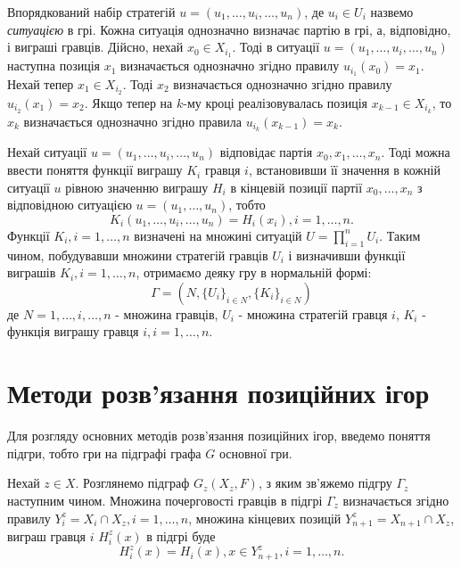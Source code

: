 \documentclass[12pt,a4paper]{article}
\begin{document}
Впорядкований набір стратегій $u=(u_1,\dots,u_i,\dots,u_n)$, де $u_i \in
U_i$ назвемо \textit{ситуацією} в грі. Кожна ситуація однозначно визначає
партію в грі, а, відповідно, і виграші гравців. Дійсно, нехай $x_0 \in
X_{i_1}$. Тоді в ситуації $u=(u_1,\dots,u_i,\dots,u_n)$ наступна позиція $x_1$
визначається однозначно згідно правилу $u_{i_1}(x_0)=x_1$. Нехай тепер $x_1 \in
X_{i_2}$. Тоді $x_2$ визначається однозначно згідно правилу
$u_{i_2}(x_1)=x_2$. Якщо тепер на $k$-му кроці реалізовувалась позиція $x_{k-1} \in
X_{i_k}$, то $x_k$ визначається однозначно згідно правила
$u_{i_k}(x_{k-1})=x_k$.

Нехай ситуації $u=(u_1,\dots,u_i,\dots,u_n)$ відповідає партія
$x_0,x_1,\dots,x_n$. Тоді можна ввести поняття функції виграшу $K_i$ гравця
$i$, встановивши її значення в кожній ситуації $u$ рівною значенню виграшу
$H_i$ в кінцевій позиції партії $x_0,\dots,x_n$ з відповідною ситуацією
$u=(u_1,\dots,u_n)$, тобто
\begin{equation*}
  K_i(u_1,\dots,u_i,\dots,u_n)=H_i(x_i), i=1,\dots,n.
\end{equation*}
Функції $K_i, i=1,\dots,n$ визначені на множині ситуацій
$U=\displaystyle\prod_{i=1}^{n}U_i$. Таким чином, побудувавши множини
стратегій гравців $U_i$ і визначивши функції виграшів $K_i, i=1,\dots,n$,
отримаємо деяку гру в нормальній формі:
\begin{equation*}
    \Gamma=(N, \{U_i\}_{i \in N}, \{K_i\}_{i \in N})
\end{equation*}
де $N={1,\dots,i,\dots,n}$ - множина гравців, $U_i$ - множина стратегій гравця
$i$, $K_i$ - функція виграшу гравця $i, i=1,\dots,n$.

\section{Методи розв'язання позиційних ігор}

Для розгляду основних методів розв'язання позиційних ігор, введемо поняття
підгри, тобто гри на підграфі графа $G$ основної гри.

Нехай $z \in X$. Розглянемо підграф $G_z(X_z, F)$, з яким зв'яжемо підгру
$\Gamma_z$ наступним чином. Множина почерговості гравців в підгрі $\Gamma_z$
визначається згідно правилу $Y_i^z=X_i \cap X_z, i=1,\dots,n$, множина
кінцевих позицій $Y_{n+1}^z=X_{n+1} \cap X_z$, виграш гравця $i$ $H_i^z(x)$ в
підгрі буде
\begin{equation*}
  H_i^z(x)=H_i(x), x \in Y_{n+1}^z, i=1,\dots,n.
\end{equation*}
\end{document}
